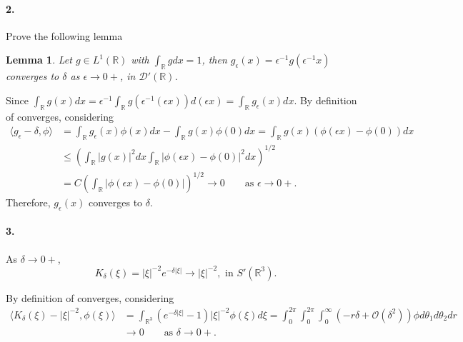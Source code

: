 \documentclass[a4paper]{book}
\makeatletter
\newenvironment{sol}[1][\solname]{\par
  \pushQED{\qed}
  \normalfont \topsep6\p@\@plus6\p@\relax
  \trivlist
  \item[\hskip\labelsep
        \itshape
    #1\@addpunct{.}]\ignorespaces
}{\popQED\endtrivlist\@endpefalse}
\providecommand{\solname}{Solution}
\newtheorem{lem}[thm]{Lemma}
\makeatother
\begin{document}
\paragraph*{2. }
Prove the following lemma 
\begin{lem}
    Let $g \in L^1(\mathbb{R})$ with  $\int_{\mathbb{R}} gdx = 1$, 
    then $g_\epsilon(x) = \epsilon^{-1} g(\epsilon^{-1} x)$ 
    converges to $\delta$ as $\epsilon \rightarrow 0+$, in $\mathcal{D}'(\mathbb{R})$. 
\end{lem}
\begin{sol}
    Since $\int_{\mathbb{R}} g(x) dx = \epsilon^{-1} 
    \int_{\mathbb{R}} g(\epsilon^{-1} (\epsilon x)) d(\epsilon x)
    = \int_{\mathbb{R}}g_\epsilon(x) dx$. By definition of 
    converges, considering
    \begin{align*}
        \langle g_\epsilon - \delta, \phi \rangle 
        &= \int_{\mathbb{R}} g_\epsilon(x)\phi(x) dx -
        \int_{\mathbb{R}} g(x)\phi(0) dx  = 
        \int_{\mathbb{R}} g(x)(\phi(\epsilon x) - \phi(0)) dx \\
        &\leq \left(\int_{\mathbb{R}}|g(x)|^2 dx \int_{\mathbb{R}} |\phi(\epsilon x) - \phi(0)|^2 dx\right)^{1/2} \\
        &= C \left(\int_{\mathbb{R}} |\phi(\epsilon x) - \phi(0) | \right)^{1/2}
        \rightarrow 0 \qquad \text{as } \epsilon \rightarrow 0+.
    \end{align*}
    Therefore, $g_\epsilon(x)$ converges to $\delta$.
\end{sol}

\paragraph*{3. }
As $\delta \rightarrow 0 +$,
\[ K_{\delta}(\xi) = |\xi|^{-2} e^{-\delta|\xi|} \rightarrow |\xi|^{-2}, \text{ in }
S'(\mathbb{R}^3).\]
\begin{sol}
    By definition of converges, considering 
    \begin{align*}
        \langle K_\delta(\xi) - |\xi|^{-2}, \phi(\xi)\rangle 
        &= \int_{\mathbb{R}^3} (e^{-\delta |\xi|} - 1) |\xi|^{-2} \phi(\xi) d\xi
        = \int_0^{2\pi} \int_{0}^{2\pi} \int_0^\infty (-r\delta + \mathcal{O}(\delta^2))\phi d\theta_1 d\theta_2 dr
        \\& \rightarrow 0 \qquad \text{as } \delta \rightarrow 0+.
    \end{align*}
\end{sol}
    
\end{document}
